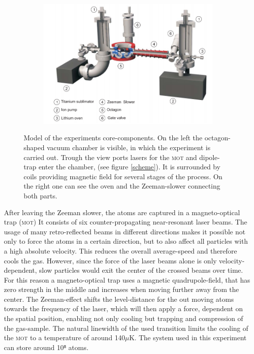 \begin{figure}[h]
\centering
\begin{subfigure}[b]{0.8\textwidth}
                \includegraphics[width=\textwidth]{exsetup}
\end{subfigure}
\caption{Model of the experiments core-components. On the left the octagon-shaped vacuum chamber is visible, in which the experiment is carried out. Trough the view ports lasers for the \textsc{mot} and dipole-trap enter the chamber, (see figure \ref{scheme}). It is surrounded by coils providing magnetic field for several stages of the process. On the right one can see the oven and the Zeeman-slower connecting both parts.}
\label{experiment}
\end{figure}

After leaving the Zeeman slower, the atoms are captured in a magneto-optical trap (\textsc{mot})
It consists of six counter-propagating near-resonant laser beams. The usage of many retro-reflected beams in different directions makes it possible not only to force the atoms in a certain direction, but to also affect all particles with a high absolute velocity. This reduces the overall average-speed and therefore cools the gas. However, since the force of the laser beams alone is only velocity-dependent, slow particles would exit the center of the crossed beams over time. For this reason a magneto-optical trap uses a magnetic quadrupole-field, that has zero strength in the middle and increases when moving further away from the center. The Zeeman-effect shifts the level-distance for the out moving atoms towards the frequency of the laser, which will then apply a force, dependent on the spatial position, enabling not only cooling but trapping and compression of the gas-sample. The natural linewidth of the used transition limits the cooling of the \textsc{mot} to a temperature of around 140$\mu \mathrm{K}$. The system used in this experiment can store around 10⁸ atoms. 

